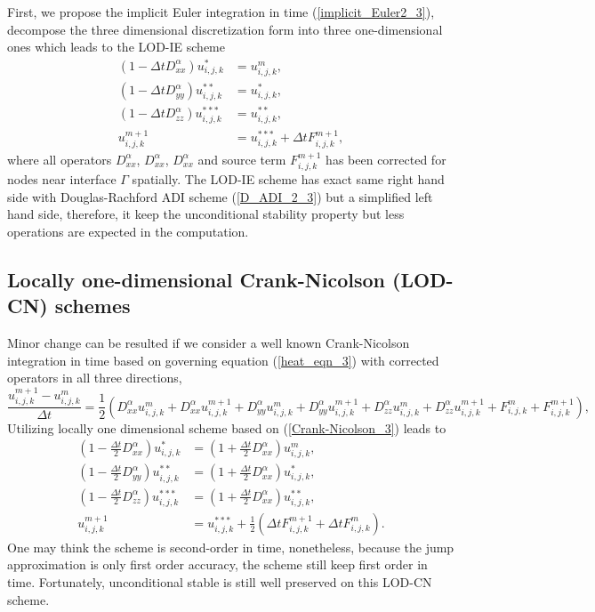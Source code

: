 \documentclass[dissertation]{uathesis}
\begin{document}
\begin{body}
\begin{flushleft}
\hspace{1cm} First, we propose the implicit Euler integration in time (\ref{implicit_Euler2_3}), decompose the three dimensional discretization form into three one-dimensional ones which leads to the LOD-IE scheme
%
\begin{align} \label{D_LODIE_3}
(1-\Delta t D^{\alpha}_{xx}) u^{*}_{i,j,k}   &= u^{m}_{i,j,k}, \nonumber \\
(1-\Delta t D^{\alpha}_{yy}) u^{**}_{i,j,k}  &= u^{*}_{i,j,k},  \\
(1-\Delta t D^{\alpha}_{zz}) u^{***}_{i,j,k} &= u^{**}_{i,j,k}, \nonumber \\
u^{m+1}_{i,j,k} &= u^{***}_{i,j,k} + \Delta t F^{m+1}_{i,j,k},
\end{align}
%
where all operators $D^{\alpha}_{xx}$, $D^{\alpha}_{xx}$, $D^{\alpha}_{xx}$ and source term $F^{m+1}_{i,j,k}$ has been corrected for nodes near interface $\Gamma$ spatially. The LOD-IE scheme has exact same right hand side with Douglas-Rachford ADI scheme (\ref{D_ADI_2_3}) but a simplified left hand side, therefore, it keep the unconditional stability property but less operations are expected in the computation.

\subsection{Locally one-dimensional Crank-Nicolson (LOD-CN) schemes}
\hspace{1cm} Minor change can be resulted if we consider a well known Crank-Nicolson integration in time based on governing equation (\ref{heat_eqn_3}) with corrected operators in all three directions, 
%
\begin{equation} \label{Crank-Nicolson_3}
\frac{u^{m+1}_{i,j,k}-u^{m}_{i,j,k}}{\Delta t} = 
\frac{1}{2}(D^{\alpha}_{xx} u^{m}_{i,j,k} + D^{\alpha}_{xx} u^{m+1}_{i,j,k} + D^{\alpha}_{yy} u^{m}_{i,j,k} + D^{\alpha}_{yy} u^{m+1}_{i,j,k} + D^{\alpha}_{zz} u^{m}_{i,j,k} + D^{\alpha}_{zz} u^{m+1}_{i,j,k} + F^{m}_{i,j,k} + F^{m+1}_{i,j,k}),
\end{equation}
%
Utilizing locally one dimensional scheme based on (\ref{Crank-Nicolson_3}) leads to
%
\begin{align} \label{D_LODCN_3}
(1-\frac{\Delta t}{2} D^{\alpha}_{xx}) u^{*}_{i,j,k}   &= (1+\frac{\Delta t}{2} D^{\alpha}_{xx})u^{m}_{i,j,k}, \nonumber \\
(1-\frac{\Delta t}{2} D^{\alpha}_{yy}) u^{**}_{i,j,k}  &= (1+\frac{\Delta t}{2} D^{\alpha}_{xx})u^{*}_{i,j,k},  \\
(1-\frac{\Delta t}{2} D^{\alpha}_{zz}) u^{***}_{i,j,k} &= (1+\frac{\Delta t}{2} D^{\alpha}_{xx})u^{**}_{i,j,k}, \nonumber \\
u^{m+1}_{i,j,k} &= u^{***}_{i,j,k} + \frac{1}{2} (\Delta t F^{m+1}_{i,j,k} + \Delta t F^{m}_{i,j,k}).
\end{align}
%
One may think the scheme is second-order in time, nonetheless, because the jump approximation is only first order accuracy, the scheme still keep first order in time. Fortunately, unconditional stable is still well preserved on this LOD-CN scheme. 


\end{flushleft}
\end{body}
\end{document}
